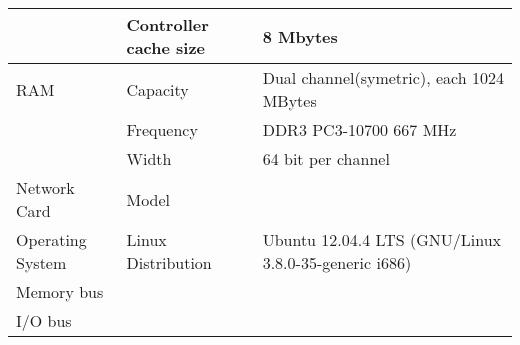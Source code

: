 \documentclass{article}
\begin{document}
\begin{table}[h]
\begin{tabular}{|l|l|l|}
    & Controller cache size & 8 Mbytes                                                                            \\ \cline{2-3}
    \hline
    \multirow{1}{*}{RAM} & Capacity & Dual channel(symetric), each 1024 MBytes \\ \cline{2-3}
    & Frequency & DDR3 PC3-10700 667 MHz                                                      \\ \cline{2-3}
    & Width & 64 bit per channel                                                     \\ \cline{2-3}
    \hline
    \multirow{1}{*}{Network Card} & Model &                                                                       \\ \cline{2-3}
    \hline
    \multirow{1}{*}{Operating System} & Linux Distribution & Ubuntu 12.04.4 LTS (GNU/Linux 3.8.0-35-generic i686) \\ \cline{2-3}
    \hline
    Memory bus & &                                                                                                \\
    \hline
    I/O bus & &                                                                                                   \\
    \hline
  \end{tabular}
\end{table}
\end{document}
